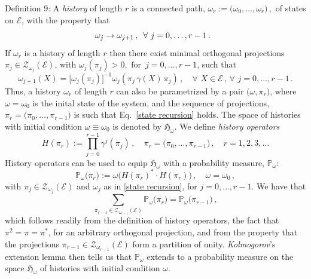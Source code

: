 \documentclass[12pt]{article}
\begin{document}
{{Definition 9}: A \textit{history} of length $r$ is a connected path,
${\omega}_{r}:= \big(\omega_0, \dots, \omega_{r}\big)\,,$ of states on $\mathcal{E}$, with the property that
\begin{equation}\label{history}
\hspace{3.5cm} \omega_j \rightarrow \omega_{j+1}\,, \, \, \,\forall \,\,j=0, \dots, r-1\,.\hspace{3.7cm} \square
\end{equation}
If ${\omega}_{r}$ is a history of length $r$ then there exist minimal orthogonal projections $\pi_j \in \mathcal{Z}_{\omega_j}(\mathcal{E})$, with $\omega_{j}(\pi_j)>0, \text{ for }\, j=0, \dots, r-1$,  such that
\begin{equation}\label{state recursion}
 \omega_{j+1}(X)= \big[\omega_{j}(\pi_j)\big]^{-1} \omega_{j}(\pi_j \, \gamma(X)\, \pi_j)\,, \quad\forall\,\, X\in \mathcal{E}\,,\,\forall\,\,j=0,\dots, r-1\,.
\end{equation}
Thus, a history ${\omega}_r$ of length $r$ can also be parametrized by a pair
$\big(\omega, {\pi}_r \big)$, where $\omega=\omega_0$ is the inital state of the system, and the sequence
of projections, ${\pi}_r =\big(\pi_0, \dots, \pi_{r-1}\big)$ is such that Eq.~\eqref{state recursion} holds. The
space of histories with initial condition $\omega\equiv \omega_0$ is denoted by $\mathfrak{H}_{\omega}$.
We define \textit{history operators}
\begin{equation}
H({\pi}_r):= \prod_{j=0}^{r-1}\gamma^{j}(\pi_j)\,, \quad {\pi}_r =\big(\pi_0, \dots, \pi_{r-1}\big)\,,\quad r=1,2,3,\dots
\end{equation}
History operators can be used to equip $\mathfrak{H}_{\omega}$ with a probability measure, $\mathbb{P}_{\omega}$:
\begin{equation}\label{prob of history}
\mathbb{P}_{\omega}\big({\pi}_r\big):= \omega\big( H({\pi}_r)^{*}\cdot H({\pi}_r)\big)\,,\quad \omega =\omega_{0} \,,
\end{equation}
with $\pi_{j} \in \mathcal{Z}_{\omega_j}(\mathcal{E})$ and $\omega_j$ as in \eqref{state recursion}, for $j=0, \dots, r-1$.
We have that
$$\sum_{\pi_{r-1} \in \mathcal{Z}_{\omega_{r-1}}(\mathcal{E})} \mathbb{P}_{\omega}\big({\pi}_r\big) =
\mathbb{P}_{\omega}\big({\pi}_{r-1}\big)\,,$$
which follows readily from the definition of history operators, the fact that $\pi^{2}=\pi= \pi^{*}$, for an arbitrary orthogonal projection, and from the property that the projections $\pi_{r-1}\in \mathcal{Z}_{\omega_{r-1}}(\mathcal{E})$ form a partition of unity. \textit{Kolmogorov}'s extension lemma then tells us that $\mathbb{P}_{\omega}$ extends to a probability measure on the space $\mathfrak{H}_{\omega}$ of histories with initial condition $\omega$.

}
\end{document}
